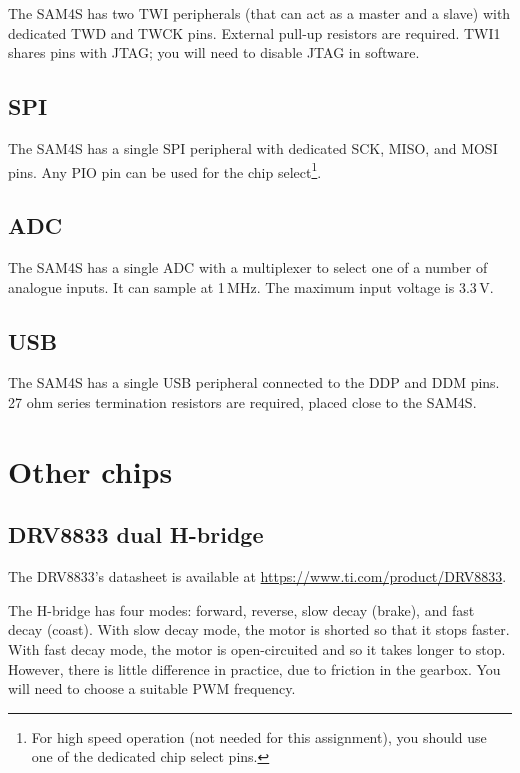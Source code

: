 The SAM4S has two TWI peripherals (that can act as a master and
a slave) with dedicated TWD and TWCK pins. External pull-up resistors
are required.  TWI1 shares pins with JTAG; you will need to disable
JTAG in software.

\subsection{SPI}\label{spi}

The SAM4S has a single SPI peripheral with dedicated SCK, MISO, and
MOSI pins. Any PIO pin can be used for the chip select\footnote{For
  high speed operation (not needed for this assignment), you should
  use one of the dedicated chip select pins.}.

\subsection{ADC}\label{adc}

The SAM4S has a single ADC with a multiplexer to select one of a
number of analogue inputs.  It can sample at 1\,MHz.  The maximum
input voltage is 3.3\,V.

\subsection{USB}\label{usb}

The SAM4S has a single USB peripheral connected to the DDP and DDM
pins. 27 ohm series termination resistors are required, placed close to
the SAM4S.

\section{Other chips}\label{other-chips}

\subsection{DRV8833 dual H-bridge}\label{drv8833-dual-h-bridge}

The DRV8833's datasheet is available at
\url{https://www.ti.com/product/DRV8833}.

The H-bridge has four modes: forward, reverse, slow decay (brake), and
fast decay (coast).  With slow decay mode, the motor is shorted so
that it stops faster.  With fast decay mode, the motor is
open-circuited and so it takes longer to stop.  However, there is
little difference in practice, due to friction in the gearbox.  You will need to choose a suitable PWM frequency.

